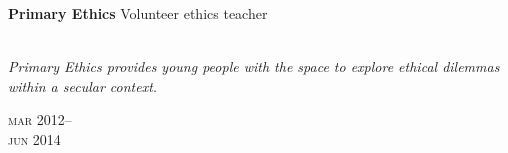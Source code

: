 \begin{minipage}[t]{\mainboxwidth\textwidth}
\textbf{Primary Ethics}\phantom{..} Volunteer ethics teacher\\
\\
{\small
\textit{Primary Ethics provides young people with the space to explore ethical dilemmas within a secular context.}
\par}
\end{minipage}
\begin{minipage}[t]{\detailboxwidth\textwidth}
{
\hfill \textsc{mar} 2012--\\ 
\hspace*{0pt} \hfill \textsc{jun} 2014
\par
}
\end{minipage}



